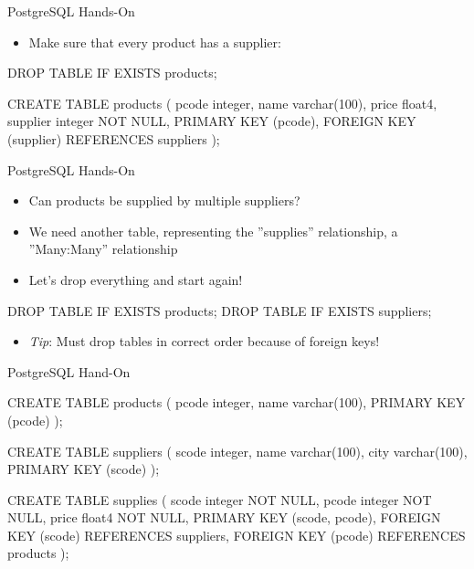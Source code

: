 \documentclass[ignorenonframetext,xcolor=x11names]{beamer}
\begin{document}
\begin{frame}[fragile]{PostgreSQL Hands-On}
\begin{itemize}
  \item Make sure that every product has a supplier:
\end{itemize}
\footnotesize
\begin{sqlcode}
DROP TABLE IF EXISTS products;

CREATE TABLE products (
  pcode    integer,
  name     varchar(100),
  price    float4,
  supplier integer NOT NULL,
  PRIMARY KEY (pcode),
  FOREIGN KEY (supplier) REFERENCES suppliers );
\end{sqlcode}
\end{frame}

\begin{frame}[fragile]{PostgreSQL Hands-On}
\begin{itemize}
  \item Can products be supplied by multiple suppliers?
  \item We need another table, representing the ''supplies'' relationship, a ''Many:Many'' relationship
  \item Let's drop everything and start again!
\end{itemize}
\footnotesize
\begin{sqlcode}
DROP TABLE IF EXISTS products;
DROP TABLE IF EXISTS suppliers;
\end{sqlcode}
\normalsize
  \begin{itemize}
    \item \emph{Tip}: Must drop tables in correct order because of foreign keys!
  \end{itemize}
\end{frame}

\begin{frame}[fragile]{PostgreSQL Hand-On}
\footnotesize
\begin{sqlcode}
CREATE TABLE products (
  pcode integer,
  name  varchar(100),
  PRIMARY KEY (pcode) );
  
CREATE TABLE suppliers (
  scode integer,
  name  varchar(100),
  city  varchar(100),
  PRIMARY KEY (scode) );
  
CREATE TABLE supplies (
  scode  integer NOT NULL,
  pcode  integer NOT NULL,
  price  float4 NOT NULL,
  PRIMARY KEY (scode, pcode),
  FOREIGN KEY (scode) REFERENCES suppliers,
  FOREIGN KEY (pcode) REFERENCES products );
\end{sqlcode}
\end{frame}
\end{document}

